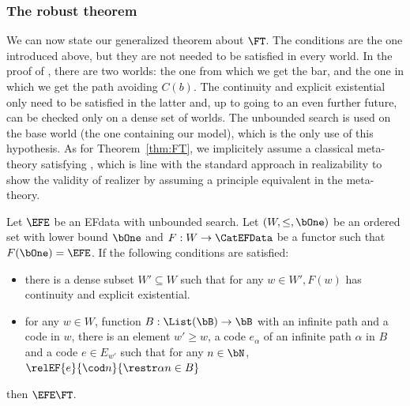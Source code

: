 \subsubsection{The robust theorem}
We can now state our generalized theorem about $\FT$. The conditions are the one introduced above, but they are not needed to be satisfied in every world. In the proof of , there are two worlds: the one from which we get the bar, and the one in which we get the path avoiding $C(b)$. The continuity and explicit existential only need to be satisfied in the latter and, up to going to an even further future, can be checked only on a dense set of worlds. The unbounded search is used on the base world (the one containing our model), which is the only use of this hypothesis.
As for Theorem~\ref{thm:FT},
we implicitely assume a classical meta-theory satisfying \WKL,
which is line with the standard approach in realizability to show the validity
of realizer by assuming a principle equivalent in the meta-theory.
\begin{theorem}\label{thm:main}
  Let $\EFE$ be an EFdata with unbounded search. Let $(W,\leq,\bOne)$ be an ordered set with lower bound $\bOne$ and $F : W \to \CatEFData$ be a functor such that $F(\bOne) = \EFE$. If the following conditions are satisfied:
  \begin{itemize}
  \item there is a dense subset $W' \subseteq W$ such that for any $w \in W', F(w)$ has continuity and explicit existential.
  \item for any $w \in W$, function $B : \List(\bB) \to \bB$ with an infinite path
  and a code in $w$, there is an element $w' \geq w$,
  a code $e_\alpha$ of an infinite path $\alpha$ in $B$
  and a code $e \in E_{w'}$ such that for any $n \in \bN$,
  $\relEF{e}{\cod n}{\restr \alpha n \in B}$
  \end{itemize}
  then $\EFE \real \FT$.
\end{theorem}

